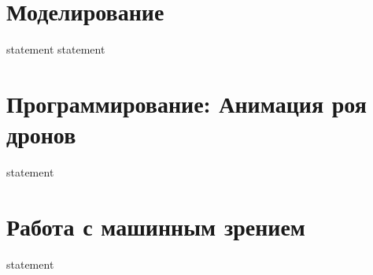 \section{Моделирование}

{statement}
{statement}

\section{Программирование: Анимация роя дронов}

{statement}

\section{Работа с машинным зрением}

{statement}
